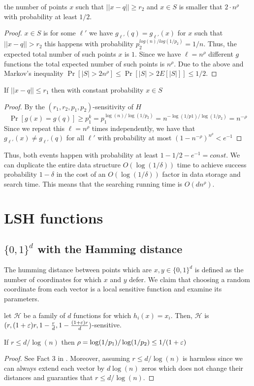 \documentclass{article}
\begin{document}
\begin{fact}
the number of points $x$ such that $||x-q|| \ge r_2$ and $x \in S$ is smaller that
$2\cdot n^{\rho}$ with probability at least $1/2$. 
\end{fact}
\begin{proof}
$x \in S$ is for some $\ell'$ we have $g_{\ell'}(q)  = g_{\ell'}(x)$ for $x$ such that $||x-q||>r_2$
this happens with probability $p_{2}^{log(n)/log(1/p_2)} = 1/n$. Thus, the expected total number of 
such points $x$ is $1$. Since we have $\ell = n^{\rho}$ different $g$ functions the total expected number of such
points is $n^{\rho}$. Due to the above and Markov's inequality $\Pr[|S| > 2n^{\rho}] \le \Pr[|S| > 2E[|S|]] \le 1/2$.   
\end{proof}

\begin{fact}
If $||x-q|| \le r_1$ then with constant probability $x \in S$
\end{fact}
\begin{proof}
By the $(r_1,r_2,p_1,p_2)$-sensitivity of $H$
\[
\Pr[g(x) = g(q)] \ge p_{1}^{k} = p_{1}^{\log(n)/\log(1/p_2)} = n^{-\log(1/p1)/\log(1/p_2)} = n^{-\rho}
\]
Since we repeat this $\ell = n^{\rho}$ times independently, we have that  $g_{\ell'}(x) \not = g_{\ell'}(q)$ for all 
$\ell'$ with probability at most $(1-n^{-\rho})^{n^{\rho}} < e^{-1}$ 
\end{proof}

Thus, both events happen with probability at least $1 - 1/2 - e^{-1} = const$.
We can duplicate the entire data structure $O(\log(1/\delta))$ time to achieve success probability $1-\delta$
in the cost of an $O(\log(1/\delta))$ factor in data storage and search time.
This means that the searching running time is $O(dn^{\rho})$.

\section{LSH functions}
\subsection{$\{0,1\}^d$  with the Hamming distance}
The humming distance between points which are $x,y\in \{0,1\}^d$ is defined as 
the number of coordinates for which $x$ and $y$ defer. We claim that choosing a random 
coordinate from each vector is a local sensitive function and examine its parameters.   
\begin{fact}
let $\mathcal{H}$ be a family of $d$ functions for which $h_i(x) = x_i$.
Then, $\mathcal{H}$ is $(r,(1+\varepsilon)r,1-\frac{r}{d},1-\frac{(1+\varepsilon)r}{d})$-sensitive.
\end{fact}
\begin{fact}
If $r \le d/\log(n)$ then $\rho = \log(1/p_1)/\log(1/p_2) \le 1/(1+\varepsilon)$
\end{fact}
\begin{proof}
See Fact 3 in \cite{GionisIM99}. Moreover, assuming $r \le d/\log(n)$ is harmless since we can always 
extend each vector by $d\log(n)$ zeros which does not change their distances and guaranties that  $r \le d/\log(n)$.
 \end{proof}
\end{document}
